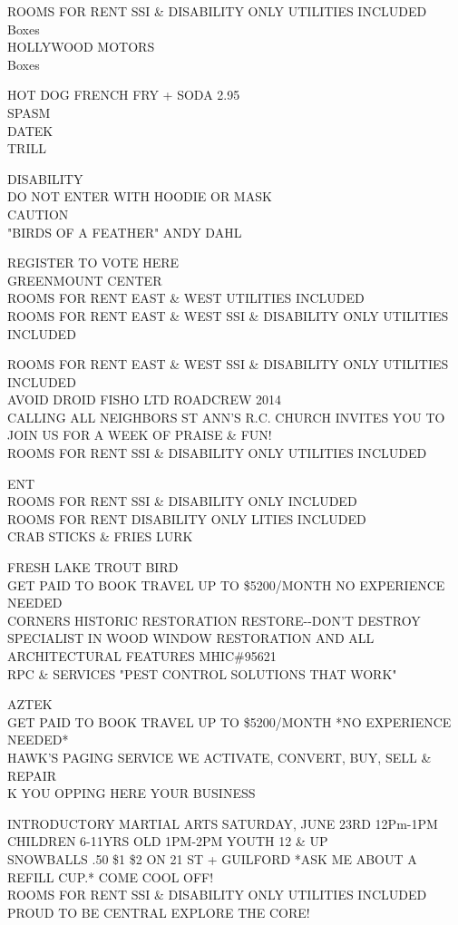 \documentclass[10pt,letterpaper]{article}
\begin{document}
ROOMS FOR RENT SSI \& DISABILITY ONLY UTILITIES INCLUDED\\
Boxes\\
HOLLYWOOD MOTORS\\
Boxes

HOT DOG FRENCH FRY + SODA 2.95\\
SPASM\\
DATEK\\
TRILL

DISABILITY\\
DO NOT ENTER WITH HOODIE OR MASK\\
CAUTION\\
"BIRDS OF A FEATHER" ANDY DAHL

REGISTER TO VOTE HERE\\
GREENMOUNT CENTER\\
ROOMS FOR RENT EAST \& WEST UTILITIES INCLUDED\\
ROOMS FOR RENT EAST \& WEST SSI \& DISABILITY ONLY UTILITIES INCLUDED

ROOMS FOR RENT EAST \& WEST SSI \& DISABILITY ONLY UTILITIES INCLUDED\\
AVOID DROID FISHO LTD ROADCREW 2014\\
CALLING ALL NEIGHBORS ST ANN'S R.C. CHURCH INVITES YOU TO JOIN US FOR A WEEK OF PRAISE \& FUN!\\
ROOMS FOR RENT SSI \& DISABILITY ONLY UTILITIES INCLUDED

ENT\\
ROOMS FOR RENT SSI \& DISABILITY ONLY INCLUDED\\
ROOMS FOR RENT DISABILITY ONLY LITIES INCLUDED\\
CRAB STICKS \& FRIES LURK

FRESH LAKE TROUT BIRD\\
GET PAID TO BOOK TRAVEL UP TO \$5200/MONTH NO EXPERIENCE NEEDED\\
CORNERS HISTORIC RESTORATION RESTORE{-}{-}DON'T DESTROY SPECIALIST IN WOOD WINDOW RESTORATION AND ALL ARCHITECTURAL FEATURES MHIC\#95621\\
RPC \& SERVICES "PEST CONTROL SOLUTIONS THAT WORK"

AZTEK\\
GET PAID TO BOOK TRAVEL UP TO \$5200/MONTH *NO EXPERIENCE NEEDED*\\
HAWK'S PAGING SERVICE WE ACTIVATE, CONVERT, BUY, SELL \& REPAIR\\
K YOU OPPING HERE YOUR BUSINESS

INTRODUCTORY MARTIAL ARTS SATURDAY, JUNE 23RD 12Pm{-}1PM CHILDREN 6{-}11YRS OLD 1PM{-}2PM YOUTH 12 \& UP\\
SNOWBALLS .50 \$1 \$2 ON 21 ST + GUILFORD *ASK ME ABOUT A REFILL CUP.* COME COOL OFF!\\
ROOMS FOR RENT SSI \& DISABILITY ONLY UTILITIES INCLUDED\\
PROUD TO BE CENTRAL EXPLORE THE CORE!
\end{document}
